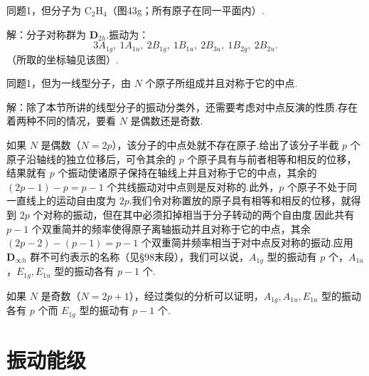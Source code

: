 \begin{xiti}
\quad 同题1，但分子为 $\mathrm{C_2H_4}$（图43g；所有原子在同一平面内）.

解：分子对称群为 $\boldsymbol{D}_{2h}$.振动为：
\begin{equation*}
  3A_{1g},\ 1A_{1u},\ 2B_{1g},\ 1B_{1u},\ 2B_{3u},\ 1B_{2g},\ 2B_{2u}.
\end{equation*}
（所取的坐标轴见该图）.

\quad 同题1，但为一线型分子，由 $N$ 个原子所组成并且对称于它的中点.

解：除了本节所讲的线型分子的振动分类外，还需要考虑对中点反演的性质.存在着两种不同的情况，要看 $N$ 是偶数还是奇数.

如果 $N$ 是偶数（$N=2p$），该分子的中点处就不存在原子.给出了该分子半截 $p$ 个原子沿轴线的独立位移后，可令其余的 $p$ 个原子具有与前者相等和相反的位移，结果就有 $p$ 个振动使诸原子保持在轴线上并且对称于它的中点，其余的 $(2p-1)-p=p-1$ 个共线振动对中点则是反对称的.此外，$p$ 个原子不处于同一直线上的运动自由度为 $2p$.我们令对称置放的原子具有相等和相反的位移，就得到 $2p$ 个对称的振动，但在其中必须扣掉相当于分子转动的两个自由度.因此共有 $p-1$ 个双重简并的频率使得原子离轴振动并且对称于它的中点，其余 $(2p-2)-(p-1)=p-1$ 个双重简并频率相当于对中点反对称的振动.应用 $\boldsymbol{D}_{\infty h}$ 群不可约表示的名称（见§98末段），我们可以说，$A_{1g}$ 型的振动有 $p$ 个，$A_{1u}$，$E_{1g},E_{1u}$ 型的振动各有 $p-1$ 个.

如果 $N$ 是奇数（$N=2p+1$），经过类似的分析可以证明，$A_{1g},A_{1u},E_{1u}$ 型的振动各有 $p$ 个而 $E_{1g}$ 型的振动有 $p-1$ 个.

\end{xiti}

\section{振动能级}

